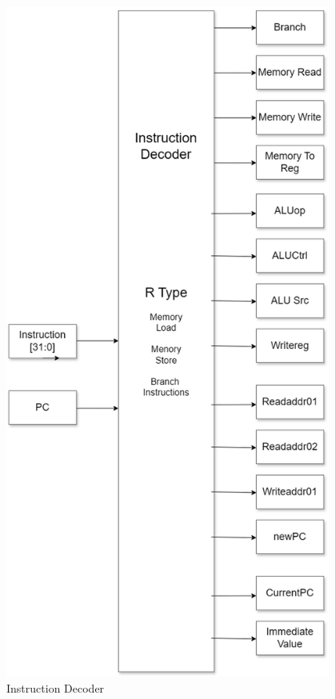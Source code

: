 \begin{itemize}
\begin{figure}[H]
    \centering
    \includegraphics[width=0.95\textwidth, height=0.8\textheight]{Image/Decoder Block Diagram.drawio.png}
    \caption{Instruction Decoder}
    \label{fig: Instruction Decoder}
\end{figure}


\end{itemize}
